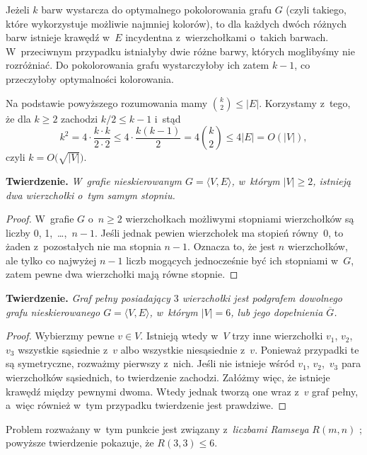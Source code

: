 \subproblem %
Jeżeli $k$ barw wystarcza do optymalnego pokolorowania grafu $G$ (czyli takiego, które wykorzystuje możliwie najmniej kolorów), to dla każdych dwóch różnych barw istnieje krawędź w~$E$ incydentna z~wierzchołkami o~takich barwach. W~przeciwnym przypadku istniałyby dwie różne barwy, których moglibyśmy nie rozróżniać. Do pokolorowania grafu wystarczyłoby ich zatem $k-1$, co przeczyłoby optymalności kolorowania.

Na podstawie powyższego rozumowania mamy $\binom{k}{2}\le|E|$. Korzystamy z~tego, że dla $k\ge2$ zachodzi $k/2\le k-1$ i~stąd
\[
    k^2 = 4\cdot\frac{k\cdot k}{2\cdot2} \le 4\cdot\frac{k(k-1)}{2} = 4\binom{k}{2} \le 4|E| = O(|V|),
\]
czyli $k=O\bigl(\!\sqrt{|V|}\bigr)$.


\subproblem %
\textsf{\textbf{Twierdzenie.}} \textit{W~grafie nieskierowanym\/ $G=\langle V,E\rangle$, w~którym\/ $|V|\ge2$, istnieją dwa wierzchołki o~tym samym stopniu.}
\begin{proof}
W~grafie $G$ o~$n\ge2$ wierzchołkach możliwymi stopniami wierzchołków są liczby 0, 1,~\dots,~$n-1$. Jeśli jednak pewien wierzchołek ma stopień równy~0, to żaden z~pozostałych nie ma stopnia $n-1$. Oznacza to, że jest $n$ wierzchołków, ale tylko co najwyżej $n-1$ liczb mogących jednocześnie być ich stopniami w~$G$, zatem pewne dwa wierzchołki mają równe stopnie.
\end{proof}

\subproblem %
\textsf{\textbf{Twierdzenie.}} \textit{Graf pełny posiadający\/ $3$ wierzchołki jest podgrafem dowolnego grafu nieskierowanego\/ $G=\langle V,E\rangle$, w~którym\/ $|V|=6$, lub jego dopełnienia\/ $\overline{G}$.}
\begin{proof}
Wybierzmy pewne $v\in V$. Istnieją wtedy w~$V$ trzy inne wierzchołki $v_1$, $v_2$,~$v_3$ wszystkie sąsiednie z~$v$ albo wszystkie niesąsiednie z~$v$. Ponieważ przypadki te są symetryczne, rozważmy pierwszy z~nich. Jeśli nie istnieje wśród $v_1$, $v_2$,~$v_3$ para wierzchołków sąsiednich, to twierdzenie zachodzi. Załóżmy więc, że istnieje krawędź między pewnymi dwoma. Wtedy jednak tworzą one wraz z~$v$ graf pełny, a~więc również w~tym przypadku twierdzenie jest prawdziwe.
\end{proof}

Problem rozważany w~tym punkcie jest związany z~\emph{liczbami Ramseya} $R(m,n)$ \cite{ramseynumber}; powyższe twierdzenie pokazuje, że $R(3,3)\le6$.


